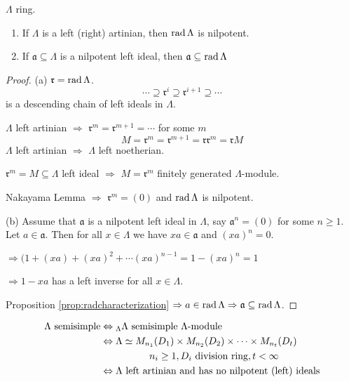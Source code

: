 \begin{lem}
$\Lambda$ ring.
\begin{enumerate}[\rm(a)]
\item If $\Lambda$ is a left (right) artinian, then $\operatorname{rad}\nolimits\Lambda$ is
  nilpotent. 
\item If $\mathfrak{a}\subseteq \Lambda$ is a nilpotent left ideal,
  then $\mathfrak{a} \subseteq \operatorname{rad}\nolimits\Lambda$
\end{enumerate}
\end{lem}
\begin{proof}
(a) $\mathfrak{r} = \operatorname{rad}\nolimits\Lambda$. 
\[\cdots \supseteq \mathfrak{r}^i \supseteq \mathfrak{r}^{i+1}
  \supseteq \cdots\]
is a descending chain of left ideals in $\Lambda$.

$\Lambda$ left artinian $\Rightarrow$ $\mathfrak{r}^m =
\mathfrak{r}^{m+1} = \cdots$ for some $m$
\[M=\mathfrak{r}^m = \mathfrak{r}^{m+1} = \mathfrak{r}\mathfrak{r}^m = \mathfrak{r}M\]
$\Lambda$ left artinian $\Rightarrow$ $\Lambda$ left noetherian.

$\mathfrak{r}^m = M \subseteq \Lambda$ left ideal $\Rightarrow$
$M=\mathfrak{r}^m$ finitely generated $\Lambda$-module.

Nakayama Lemma $\Rightarrow$ $\mathfrak{r}^m = (0)$ and $\operatorname{rad}\nolimits\Lambda$
is nilpotent.

(b)  Assume that $\mathfrak{a}$ is a nilpotent left ideal in
$\Lambda$, say $\mathfrak{a}^n = (0)$ for some $n\geq 1$.  Let $a\in
\mathfrak{a}$. Then for all $x\in\Lambda$ we have $xa\in\mathfrak{a}$
and $(xa)^n=0$.

$\Rightarrow  (1 + (xa) + (xa)^2 + \cdots (xa)^{n-1} = 1 - (xa)^n = 1$

$\Rightarrow 1 -xa$ has a left inverse for all $x\in\Lambda$.

Proposition \ref{prop:radcharacterization} $\Rightarrow a\in\operatorname{rad}\nolimits\Lambda \Rightarrow
\mathfrak{a}\subseteq \operatorname{rad}\nolimits\Lambda$. 
\end{proof}

\begin{recall}
\begin{align}
\Lambda \textrm{\ semisimple}\index{ring!semisimple} & \Leftrightarrow {_\Lambda\Lambda}
                                \textrm{\ semisimple $\Lambda$-module}\notag\\
& \Leftrightarrow \Lambda\simeq M_{n_1}(D_1)\times
  M_{n_2}(D_2)\times\cdots \times M_{n_t}(D_t)\notag\\
& \hphantom{\Leftrightarrow}\qquad \qquad n_i\geq 1, D_i \textrm{\ division ring}, t
  < \infty\notag\\
& \Leftrightarrow \Lambda \textrm{\ left artinian and has no nilpotent
  (left) ideals}\notag
\end{align}
\end{recall}


